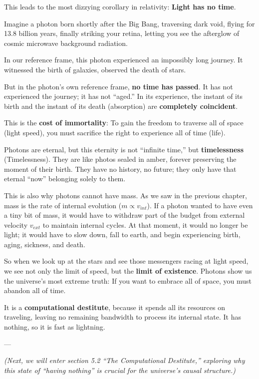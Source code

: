 \documentclass[11pt,a4paper,twoside]{book}
\begin{document}
This leads to the most dizzying corollary in relativity: \textbf{Light has no time}.

Imagine a photon born shortly after the Big Bang, traversing dark void, flying for 13.8 billion years, finally striking your retina, letting you see the afterglow of cosmic microwave background radiation.

In our reference frame, this photon experienced an impossibly long journey. It witnessed the birth of galaxies, observed the death of stars.

But in the photon's own reference frame, \textbf{no time has passed}. It has not experienced the journey; it has not ``aged.'' In its experience, the instant of its birth and the instant of its death (absorption) are \textbf{completely coincident}.

This is the \textbf{cost of immortality}: To gain the freedom to traverse all of space (light speed), you must sacrifice the right to experience all of time (life).

Photons are eternal, but this eternity is not ``infinite time,'' but \textbf{timelessness} (Timelessness). They are like photos sealed in amber, forever preserving the moment of their birth. They have no history, no future; they only have that eternal ``now'' belonging solely to them.

This is also why photons cannot have mass. As we saw in the previous chapter, mass is the rate of internal evolution ($m \propto v_{int}$). If a photon wanted to have even a tiny bit of mass, it would have to withdraw part of the budget from external velocity $v_{ext}$ to maintain internal cycles. At that moment, it would no longer be light; it would have to slow down, fall to earth, and begin experiencing birth, aging, sickness, and death.

So when we look up at the stars and see those messengers racing at light speed, we see not only the limit of speed, but the \textbf{limit of existence}. Photons show us the universe's most extreme truth: If you want to embrace all of space, you must abandon all of time.

It is a \textbf{computational destitute}, because it spends all its resources on traveling, leaving no remaining bandwidth to process its internal state. It has nothing, so it is fast as lightning.

---

\textit{(Next, we will enter section 5.2 ``The Computational Destitute,'' exploring why this state of ``having nothing'' is crucial for the universe's causal structure.)}
\end{document}
